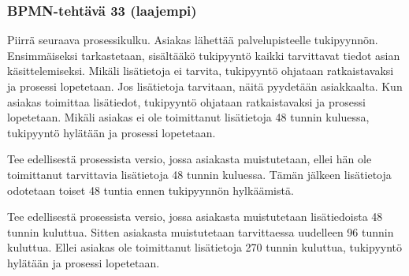 \documentclass[
  finnish,
  letterpaper,
  DIV=11,
  numbers=noendperiod,
  oneside]{scrreprt}
\begin{document}
\subsubsection{BPMN-tehtävä 33
(laajempi)}\label{bpmn-tehtuxe4vuxe4-33-laajempi}

Piirrä seuraava prosessikulku. Asiakas lähettää palvelupisteelle
tukipyynnön. Ensimmäiseksi tarkastetaan, sisältääkö tukipyyntö kaikki
tarvittavat tiedot asian käsittelemiseksi. Mikäli lisätietoja ei
tarvita, tukipyyntö ohjataan ratkaistavaksi ja prosessi lopetetaan. Jos
lisätietoja tarvitaan, näitä pyydetään asiakkaalta. Kun asiakas
toimittaa lisätiedot, tukipyyntö ohjataan ratkaistavaksi ja prosessi
lopetetaan. Mikäli asiakas ei ole toimittanut lisätietoja 48 tunnin
kuluessa, tukipyyntö hylätään ja prosessi lopetetaan.

Tee edellisestä prosessista versio, jossa asiakasta muistutetaan, ellei
hän ole toimittanut tarvittavia lisätietoja 48 tunnin kuluessa. Tämän
jälkeen lisätietoja odotetaan toiset 48 tuntia ennen tukipyynnön
hylkäämistä.

Tee edellisestä prosessista versio, jossa asiakasta muistutetaan
lisätiedoista 48 tunnin kuluttua. Sitten asiakasta muistutetaan
tarvittaessa uudelleen 96 tunnin kuluttua. Ellei asiakas ole toimittanut
lisätietoja 270 tunnin kuluttua, tukipyyntö hylätään ja prosessi
lopetetaan.
\end{document}

